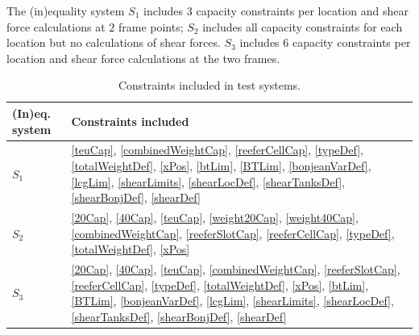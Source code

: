 The (in)equality system $S_1$ includes $3$ capacity constraints per location and shear force calculations at $2$ frame points; $S_2$ includes all capacity constraints for each location but no calculations of shear forces. $S_3$ includes 6 capacity constraints per location and shear force calculations at the two frames.
\begin{table}[H]
\centering
{\renewcommand{\arraystretch}{1.2}
\begin{tabular}[t]{l|p{9cm}}
(In)eq. system&Constraints included\\
\hline
$S_1$& \eqref{teuCap}, \eqref{combinedWeightCap}, \eqref{reeferCellCap}, \eqref{typeDef}, \eqref{totalWeightDef}, \eqref{xPos}, \eqref{btLim}, \eqref{BTLim}, \eqref{bonjeanVarDef},  \eqref{lcgLim}, \eqref{shearLimits}, {\eqref{shearLocDef}}, \eqref{shearTanksDef}, \eqref{shearBonjDef}, \eqref{shearDef}\\
\hline
$S_2$&\eqref{20Cap}, \eqref{40Cap}, \eqref{teuCap}, \eqref{weight20Cap}, \eqref{weight40Cap}, \eqref{combinedWeightCap}, \eqref{reeferSlotCap}, \eqref{reeferCellCap}, \eqref{typeDef}, \eqref{totalWeightDef}, \eqref{xPos}\\
\hline
$S_3$& \eqref{20Cap}, \eqref{40Cap}, \eqref{teuCap}, \eqref{combinedWeightCap}, \eqref{reeferSlotCap}, \eqref{reeferCellCap},  \eqref{typeDef}, \eqref{totalWeightDef}, \eqref{xPos}, \eqref{btLim}, \eqref{BTLim}, \eqref{bonjeanVarDef}, \eqref{lcgLim}, \eqref{shearLimits}, {\eqref{shearLocDef}}, \eqref{shearTanksDef}, \eqref{shearBonjDef},  \eqref{shearDef}\\
\end{tabular}
}
\caption{Constraints included in test systems.}\label{fig:constraints}
\end{table}
%

